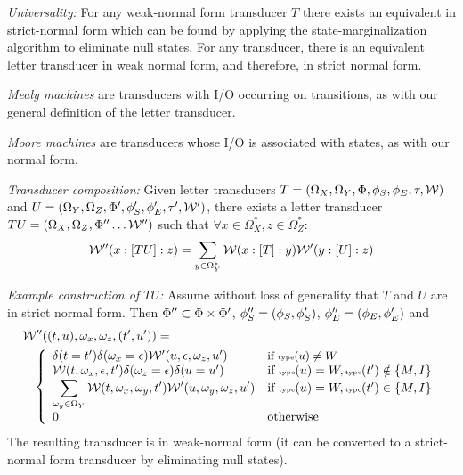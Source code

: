 \documentclass{beamer}
\begin{document}
\begin{frame}{}

{\em Universality:}
For any weak-normal form transducer $T$ there exists an equivalent in strict-normal form which can be found by applying the state-marginalization algorithm to eliminate null states.
For any transducer, there is an equivalent letter transducer in weak normal form, and therefore, in strict normal form.
\end{frame}

\begin{frame}{}

{\em Mealy machines} are transducers with I/O occurring on transitions, as with our general definition of the letter transducer.

{\em Moore machines} are transducers whose I/O is associated with states, as with our normal form.

\end{frame}

\begin{frame}{}

{\em Transducer composition:}
Given letter transducers
 $T = (\Omega_X, \Omega_Y, \Phi, \phi_S, \phi_E, \tau, {\cal W})$ and
 $U = (\Omega_Y, \Omega_Z, \Phi', \phi_S', \phi_E', \tau', {\cal W}')$,
there exists a letter transducer $T U = (\Omega_X, \Omega_Z, \Phi'' \ldots {\cal W}'')$ 
such that $\forall x \in \Omega_X^\ast, z \in \Omega_Z^\ast$:
\[
{\cal W}''(x : [T U] : z) = \sum_{y\in\Omega_Y^\ast} {\cal W}(x : [T] : y) {\cal W}'(y : [U] : z)
\]

\end{frame}

\begin{frame}{}

{\em Example construction of $TU$:}
Assume without loss of generality that $T$ and $U$ are in strict normal form.
Then $\Phi'' \subset \Phi \times \Phi'$,
$\phi_S''=(\phi_S,\phi_S')$, $\phi_E''=(\phi_E,\phi_E')$
and
\small
\begin{eqnarray*}
\lefteqn{\weight''((t,u),\omega_x,\omega_z,(t',u')) =} & & \\
& & \left\{ \begin{array}{ll}
\delta(t=t') \delta(\omega_x=\epsilon) \weight'(u,\epsilon,\omega_z,u') & \mbox{\small if $\statetype(u) \neq W$} \\
\weight(t,\omega_x,\epsilon,t') \delta(\omega_z=\epsilon) \delta(u=u') & \mbox{if $\statetype(u) = W,\statetype(t') \notin \{M,I\}$} \\
\displaystyle
\sum_{\omega_y \in \Omega_Y} \weight(t,\omega_x,\omega_y,t') \weight'(u,\omega_y,\omega_z,u') & \mbox{if $\statetype(u) = W,\statetype(t') \in \{M,I\}$} \\
0 & \mbox{otherwise}
\end{array} \right.
\end{eqnarray*}
\normalsize
The resulting transducer is in weak-normal form (it can be converted to a strict-normal form transducer by eliminating null states).

\end{frame}
\end{document}
